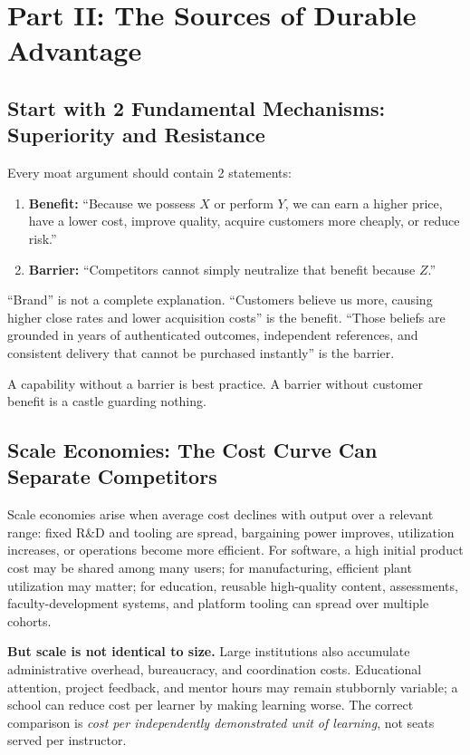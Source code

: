 \section*{Part II: The Sources of Durable Advantage}
\label{sec:part2_sources_of_durable_advantage}

\subsection{Start with 2 Fundamental Mechanisms: Superiority and Resistance}
\label{sec:two_fundamental_mechanisms}

Every moat argument should contain 2 statements:
\begin{enumerate}
    \item \textbf{Benefit:} ``Because we possess $X$ or perform $Y$, we can earn a higher price, have a lower cost, improve quality, acquire customers more cheaply, or reduce risk.''
    \item \textbf{Barrier:} ``Competitors cannot simply neutralize that benefit because $Z$.''
\end{enumerate}

``Brand'' is not a complete explanation. ``Customers believe us more, causing higher close rates and lower acquisition costs'' is the benefit. ``Those beliefs are grounded in years of authenticated outcomes, independent references, and consistent delivery that cannot be purchased instantly'' is the barrier.

A capability without a barrier is best practice. A barrier without customer benefit is a castle guarding nothing.

\subsection{Scale Economies: The Cost Curve Can Separate Competitors}
\label{sec:scale_economies}

Scale economies arise when average cost declines with output over a relevant range: fixed R\&D and tooling are spread, bargaining power improves, utilization increases, or operations become more efficient. For software, a high initial product cost may be shared among many users; for manufacturing, efficient plant utilization may matter; for education, reusable high-quality content, assessments, faculty-development systems, and platform tooling can spread over multiple cohorts.

\textbf{But scale is not identical to size.} Large institutions also accumulate administrative overhead, bureaucracy, and coordination costs. Educational attention, project feedback, and mentor hours may remain stubbornly variable; a school can reduce cost per learner by making learning worse. The correct comparison is \textit{cost per independently demonstrated unit of learning}, not seats served per instructor.

